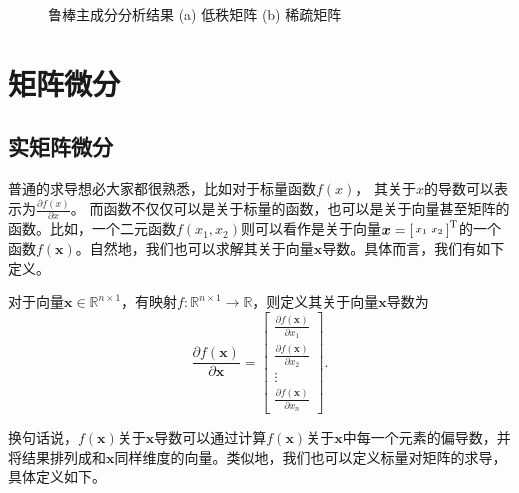 \begin{solution}
\begin{figure}[htb!]
\begin{subfigure}{.3\textwidth}
            \caption{}
            \label{fig_rpca_result_2}
        \end{subfigure}
        \caption{鲁棒主成分分析结果 (a) 低秩矩阵 (b) 稀疏矩阵}
        \label{fig_rpca_result}
    \end{figure}
\end{solution}

\section{矩阵微分}

\subsection{实矩阵微分}
普通的求导想必大家都很熟悉，比如对于标量函数$f(x)$， 其关于$x$的导数可以表示为\( \frac{\partial f(x)}{\partial x} \)。 而函数不仅仅可以是关于标量的函数，也可以是关于向量甚至矩阵的函数。比如，一个二元函数\( f(x_1, x_2) \)则可以看作是关于向量\( \boldsymbol{x} = \begin{bsmallmatrix} x_1 & x_2 \end{bsmallmatrix}^{\mathrm{T}} \)的一个函数\( f(\bm{x}) \)。自然地，我们也可以求解其关于向量\( \bm{x} \)导数。具体而言，我们有如下定义。

\begin{definition}[标量关于向量求导]
    对于向量$\bm{x} \in \mathbb{R}^{n \times 1}$，有映射\( f: \mathbb{R}^{n \times 1} \rightarrow \mathbb{R} \)，则定义其关于向量\( \bm{x} \)导数为
    \[
        \frac{\partial f(\bm{x})}{\partial \bm{x}}  =
        \begin{bmatrix}
            \frac{\partial f(\bm{x})}{\partial x_1} \\
            \frac{\partial f(\bm{x})}{\partial x_2} \\
            \vdots                                  \\
            \frac{\partial f(\bm{x})}{\partial x_n}
        \end{bmatrix}.
    \]
\end{definition}

换句话说，\( f(\bm{x}) \)关于\( \bm{x} \)导数可以通过计算\( f(\bm{x}) \)关于\( \bm{x} \)中每一个元素的偏导数，并将结果排列成和\( \bm{x} \)同样维度的向量。类似地，我们也可以定义标量对矩阵的求导，具体定义如下。

